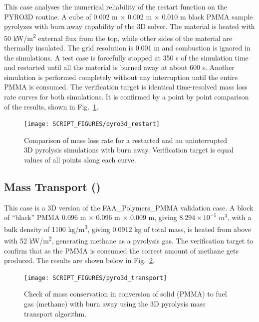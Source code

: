 \documentclass[11pt]{book}
\begin{document}
	\noindent This case analyses the numerical reliability of the restart function on the PYRO3D routine. A cube of 0.002 m $\times$ 0.002 m $\times$ 0.010 m black PMMA sample pyrolyzes with burn away capability of the 3D solver. The material is heated with 50 \si{kW/m^2} external flux from the top, while other sides of the material are thermally insulated. The grid resolution is 0.001 m and combustion is ignored in the simulations. A test case is forcefully stopped at 350 s of the simulation time and restarted until all the material is burned away at about 600 s. Another simulation is performed completely without any interruption until the entire PMMA is consumed. The verification target is identical time-resolved mass loss rate curves for both simulations. It is confirmed by a point by point comparison of the results, shown in Fig.~\ref{fig:pyro3d_restart}.

	\begin{figure}[!ht]
		\centering
		\texttt{[image: SCRIPT\_FIGURES/pyro3d\_restart]}
		\caption[PYRO3D restart (the {\ct pyro3d\_restart} case)]{Comparison of mass loss rate for a restarted and an uninterrupted 3D pyrolysis simulations with burn away. Verification target is equal values of all points along each curve.}
		\label{fig:pyro3d_restart}
	\end{figure}

\subsection{Mass Transport (\texorpdfstring{}{pyro3d\_transport})}
\label{pyro3d_transport}

This case is a 3D version of the {\ct FAA\_Polymers\_PMMA} validation case.  A block of ``black'' PMMA 0.096 m $\times$ 0.096 m $\times$ 0.009 m, giving $8.294 \times 10^{-5} \;\si{m^3}$, with a bulk density of 1100 \si{kg/m^3}, giving 0.0912 kg of total mass, is heated from above with 52 \si{kW/m^2}, generating methane as a pyrolysis gas.  The verification target to confirm that as the PMMA is consumed the correct amount of methane gets produced.  The results are shown below in Fig.~\ref{fig:pyro3d_transport}.

\begin{figure}[!ht]
    \centering
    \texttt{[image: SCRIPT\_FIGURES/pyro3d\_transport]}
    \caption[PYRO3D with mass transport of fuel gas (the {\ct pyro3d\_transport} case)]{Check of mass conservation in conversion of solid (PMMA) to fuel gas (methane) with burn away using the 3D pyrolysis mass transport algorithm.}
    \label{fig:pyro3d_transport}
\end{figure}
\end{document}
